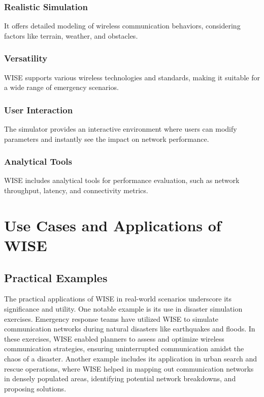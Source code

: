 \documentclass[journal]{IEEEtran}
\begin{document}
\subsubsection{Realistic Simulation} It offers detailed modeling of wireless communication behaviors, considering factors like terrain, weather, and obstacles.

\subsubsection{Versatility} WISE supports various wireless technologies and standards, making it suitable for a wide range of emergency scenarios.

\subsubsection{User Interaction} The simulator provides an interactive environment where users can modify parameters and instantly see the impact on network performance.

\subsubsection{Analytical Tools} WISE includes analytical tools for performance evaluation, such as network throughput, latency, and connectivity metrics.

\section{Use Cases and Applications of WISE}

\subsection{Practical Examples}
The practical applications of WISE in real-world scenarios underscore its significance and utility. One notable example is its use in disaster simulation exercises. Emergency response teams have utilized WISE to simulate communication networks during natural disasters like earthquakes and floods. In these exercises, WISE enabled planners to assess and optimize wireless communication strategies, ensuring uninterrupted communication amidst the chaos of a disaster. Another example includes its application in urban search and rescue operations, where WISE helped in mapping out communication networks in densely populated areas, identifying potential network breakdowns, and proposing solutions.
\end{document}
